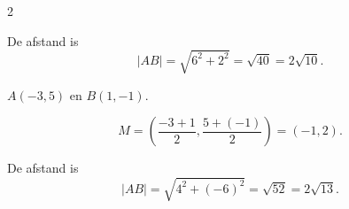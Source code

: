 \documentclass{ximera}
\begin{document}
\begin{oefening}{\oefB\ESS}
\begin{multicols}{2}
\begin{question}
\begin{oplossing}
De afstand is
\[
|AB|
=\sqrt{6^2+2^2}
=\sqrt{40}
=2\sqrt{10}.
\]
\end{oplossing}
\end{question}


\begin{question}
$A(-3,5)$ en $B(1,-1)$.

\begin{oplossing}
\[
M=
\left(
\frac{-3+1}{2},
\frac{5+(-1)}{2}
\right)
=(-1,2).
\]

De afstand is
\[
|AB|
=\sqrt{4^2+(-6)^2}
=\sqrt{52}
=2\sqrt{13}.
\]
\end{oplossing}
\end{question}

\end{multicols}

\end{oefening}

\end{document}
